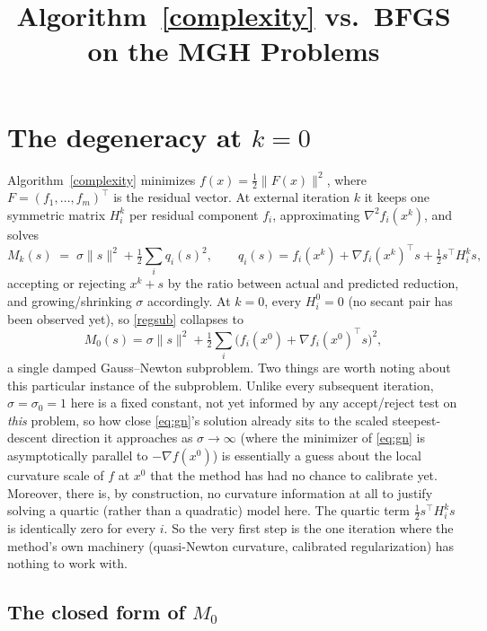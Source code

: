 \documentclass[11pt]{article}
\title{Algorithm~\ref{complexity} vs.\ BFGS on the MGH Problems}
\author{}
\date{}
\newcommand{\norm}[1]{\|#1\|}
\begin{document}
\maketitle

\section{The degeneracy at $k=0$}

Algorithm~\ref{complexity} minimizes $f(x) = \tfrac12\norm{F(x)}^2$, where
$F=(f_1,\dots,f_m)^\top$ is the residual vector. At external iteration $k$
it keeps one symmetric matrix $H_i^k$ per residual component $f_i$,
approximating $\nabla^2 f_i(x^k)$, and solves
\begin{equation}
	M_k(s) \;=\; \sigma\norm{s}^2 + \tfrac12\sum_i q_i(s)^2, \qquad
	q_i(s) = f_i(x^k) + \nabla f_i(x^k)^\top s + \tfrac12 s^\top H_i^k s,
	\label{regsub}
\end{equation}
accepting or rejecting $x^k+s$ by the ratio between actual and predicted
reduction, and growing/shrinking $\sigma$ accordingly. At $k=0$, every $H_i^0=0$ (no secant pair has been observed yet), so
\eqref{regsub} collapses to
\begin{equation}
	M_0(s) = \sigma\norm{s}^2 + \tfrac12\sum_i \bigl(f_i(x^0) + \nabla f_i(x^0)^\top s\bigr)^2,
	\label{eq:gn}
\end{equation}
a single damped Gauss--Newton subproblem. Two things are worth noting
about this particular instance of the subproblem. Unlike every subsequent
iteration, $\sigma=\sigma_0=1$ here is a fixed constant, not yet informed
by any accept/reject test on \emph{this} problem, so how close
\eqref{eq:gn}'s solution already sits to the scaled steepest-descent
direction it approaches as $\sigma\to\infty$ (where the minimizer of
\eqref{eq:gn} is asymptotically parallel to $-\nabla f(x^0)$) is
essentially a guess about the local curvature scale of $f$ at $x^0$ that
the method has had no chance to calibrate yet. Moreover, there is, by
construction, no curvature
information at all to justify solving a quartic (rather than a quadratic)
model here. The quartic term $\tfrac12 s^\top H_i^k s$ is identically zero
for every $i$. So the very first step is the one iteration where the
method's own machinery (quasi-Newton curvature, calibrated regularization)
has nothing to work with.

\subsection{The closed form of $M_0$}
\label{sec:closedform}
\end{document}
